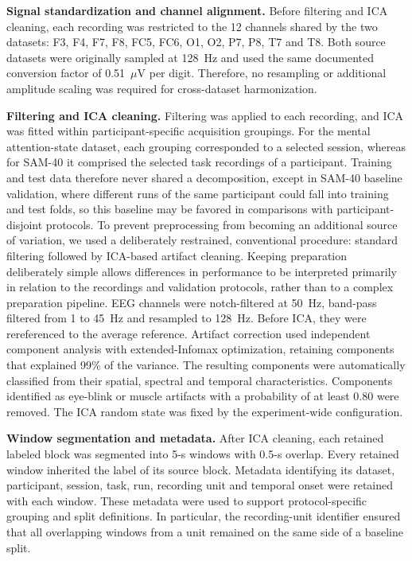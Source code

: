 \documentclass[10pt,letterpaper]{article}
\newcommand{\rev}[1]{#1}
\begin{document}
\rev{\textbf{Signal standardization and channel alignment.} Before filtering
and ICA cleaning, each recording was restricted to the 12 channels shared by
the two datasets: F3, F4, F7, F8, FC5, FC6, O1, O2, P7, P8, T7 and T8. Both
source datasets were originally sampled at 128~Hz and used the same documented
conversion factor of 0.51~$\mu$V per digit. Therefore, no resampling or
additional amplitude scaling was required for cross-dataset harmonization.}

\rev{\textbf{Filtering and ICA cleaning.} Filtering was applied to each
recording, and ICA was fitted within participant-specific acquisition
groupings. For the mental attention-state dataset, each grouping corresponded
to a selected session, whereas for SAM-40 it comprised the selected task recordings
of a participant. Training and test data therefore
never shared a decomposition, except in SAM-40 baseline validation, where
different runs of the same participant could fall into training and test folds,
so this baseline may be favored in comparisons with participant-disjoint protocols. To prevent preprocessing from becoming an additional source
of variation, we used a deliberately restrained, conventional procedure:
standard filtering followed by ICA-based artifact cleaning. Keeping
preparation deliberately simple allows differences in performance to be
interpreted primarily in relation to the recordings and validation protocols,
rather than to a complex preparation pipeline. EEG channels were notch-filtered
at 50~Hz, band-pass filtered from 1 to 45~Hz and resampled to 128~Hz. Before
ICA, they were rereferenced to the average reference. Artifact correction used independent component analysis with
extended-Infomax optimization, retaining components that explained 99\% of the
variance. The resulting components were automatically classified from their
spatial, spectral and temporal characteristics. Components identified as
eye-blink or muscle artifacts with a probability of at least 0.80 were removed.
The ICA random state was fixed by the experiment-wide configuration.}

\rev{\textbf{Window segmentation and metadata.} After ICA cleaning, each
retained labeled block was segmented into 5-s windows with 0.5-s overlap.
Every retained window inherited the label of its source block. Metadata
identifying its dataset, participant, session, task, run, recording unit and
temporal onset were retained with each window. These metadata were used to
support protocol-specific grouping and split definitions. In particular, the
recording-unit identifier ensured that all overlapping windows from a unit
remained on the same side of a baseline split.}
\end{document}
